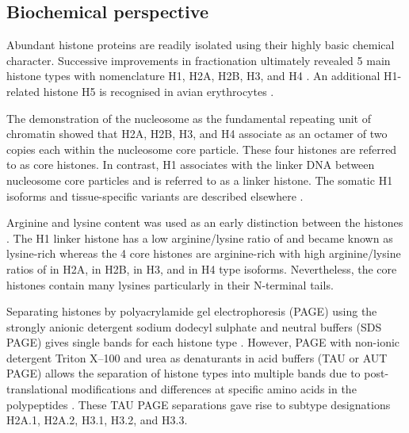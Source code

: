   \subsection{Biochemical perspective}

    Abundant histone proteins are readily isolated using their
    highly basic chemical character.
    Successive improvements in fractionation ultimately revealed 5 main histone types
    with nomenclature H1, H2A, H2B, H3, and H4 \citep{nomenclature}.
    An additional H1-related histone H5 is recognised in avian erythrocytes \citep{HFive-review}.

    The demonstration of the nucleosome as the fundamental
    repeating unit of chromatin \citep{Kornberg1974}
    showed that H2A, H2B, H3, and H4 associate as an octamer of two copies each within the
    nucleosome core particle. These four histones are referred to as core histones.
    In contrast, H1 associates with the linker DNA between nucleosome core particles
    and is referred to as a linker histone.
    The somatic H1 isoforms and tissue-specific
    variants are described elsewhere \citep{HarshmanFreitas2013}.

    Arginine and lysine content was used as an early distinction between the histones \citep{ElginWeintraub1975}.
    The H1 linker histone has a low arginine/lysine ratio of
     \result{}
    and became known as lysine-rich
    whereas the 4 core histones are arginine-rich
    with high arginine/lysine ratios of
     \result{} in H2A,
     \result{} in H2B,
     \result{} in H3,
    and  \result{} in H4 type isoforms.
    Nevertheless, the core histones contain many lysines particularly in their N-terminal tails.

    Separating histones by polyacrylamide gel electrophoresis (PAGE)
    using the strongly anionic detergent sodium dodecyl sulphate and neutral buffers (SDS PAGE)
    gives single bands for each histone type \citep{ShechterHake2007}.
    However, PAGE with non-ionic detergent Triton X--100 and urea as denaturants
    in acid buffers (TAU or AUT PAGE) allows the separation
    of histone types into multiple bands
    due to post-translational modifications and differences at specific amino acids
    in the polypeptides \citep{Zweidler1977}.
    These TAU PAGE separations gave rise to subtype designations
    H2A.1, H2A.2, H3.1, H3.2, and H3.3.

